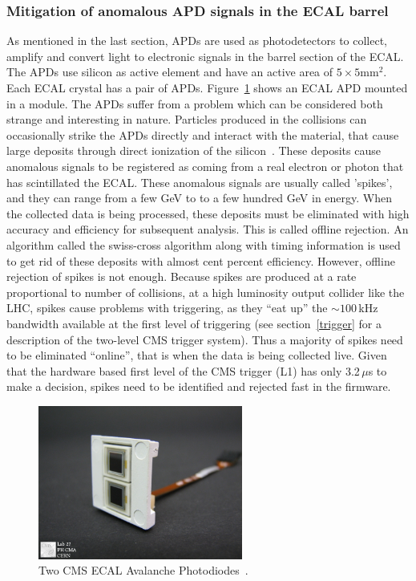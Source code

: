 \subsubsection{Mitigation of anomalous APD signals in the ECAL barrel}
As mentioned in the last section, APDs are used as photodetectors to collect, amplify and convert light to electronic signals in the barrel section of the ECAL. The APDs use silicon as active element and have an active area of $5\times5\mathrm{mm}^2$. Each ECAL crystal has a pair of APDs. Figure~\ref{fig:apd} shows an ECAL APD mounted in a module. The APDs suffer from a problem which can be considered both strange and interesting in nature. Particles produced in the collisions can occasionally strike the APDs directly and interact with the material, that cause large deposits through direct ionization of the silicon~\cite{petyt}. These deposits cause anomalous signals to be registered as coming from a real electron or photon that has scintillated the ECAL. These anomalous signals are usually called 'spikes', and they can range from a few GeV to to a few hundred GeV in energy. When the collected data is being processed, these  deposits must be eliminated with high accuracy and efficiency for subsequent analysis. This is called offline rejection. An algorithm called the swiss-cross algorithm along with timing information is used to get rid of these deposits with almost cent percent efficiency. However, offline rejection of spikes is not enough. Because spikes are produced at a rate proportional to number of collisions, at a high luminosity output collider like the LHC, spikes cause problems with triggering, as they ``eat up'' the $\sim100\,$kHz bandwidth available at the first level of triggering (see section~\ref{trigger} for a description of the two-level CMS trigger system). Thus a majority of spikes need to be eliminated ``online'', that is when the data is being collected live. Given that the hardware based first level of the CMS trigger (L1) has only 3.2\,$\mu$s to make a decision, spikes need to be identified and rejected fast in the firmware.     

\begin{figure}
\begin{center}
  \includegraphics[width=0.6\textwidth,keepaspectratio]{plots_and_figures/chapter3/apd.jpg}
\caption{Two CMS ECAL Avalanche Photodiodes~\cite{apd}.}
\label{fig:apd}
\end{center}
\end{figure}

